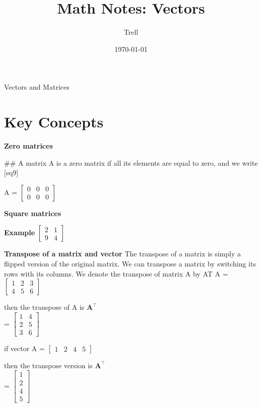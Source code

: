 \documentclass{article}
\title{Math Notes: Vectors}
\author{Trell}
\date{\today}
\begin{document}
\maketitle Vectors and Matrices

\section{Key Concepts}
\textbf {Zero matrices}

## A matrix A is a zero matrix if all its elements are equal to zero, and we write [eq9] 

A = $\begin{bmatrix}
 0 & 0 & 0 \\
 0 & 0 & 0
\end{bmatrix}$

\textbf {Square matrices}

\textbf {Example}
$\begin{bmatrix}
  2 & 1 \\
  9 & 4
\end{bmatrix}$

\textbf {Transpose of a matrix and vector}
The transpose of a matrix is simply a flipped version of the original matrix. We can transpose a matrix by switching its rows with its columns. We denote the transpose of matrix A by AT
A = $\begin{bmatrix}
  1 & 2 & 3 \\
  4 & 5 & 6
\end{bmatrix}$

then the transpose of A is 
$\mathbf{A}^\intercal$\\ = $\begin{bmatrix}
  1 & 4 \\
  2 & 5 \\
  3 & 6
\end{bmatrix}$

if vector A = $\begin{bmatrix}
  1 & 2 & 4 & 5
\end{bmatrix}$

then the transpose version is $\mathbf{A}^\intercal$\\ =  $\begin{bmatrix}
  1 \\
  2 \\
  4 \\ 
  5
\end{bmatrix}$
\end{document}

